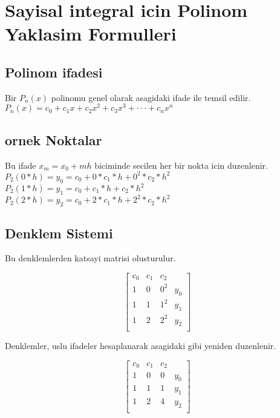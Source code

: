 \documentclass{article}
\begin{document}
\setlength\parindent{0pt}
\section{Sayisal integral icin Polinom Yaklasim Formulleri}
\subsection{Polinom ifadesi}
Bir $P_{n}(x)$ polinomu genel olarak asagidaki ifade ile temsil edilir.\\
$\displaystyle P_{n}(x)= c_{0}+c_{1}x+c_{2}x^{2}+c_{3}x^{3}+\cdot\cdot\cdot+c_{n}x^{n}$
\subsection{ornek Noktalar}
Bu ifade $x_{m}=x_{0}+mh$ biciminde secilen her bir nokta icin duzenlenir.\\
$\displaystyle P_{2}(0*h)=y_{0}=c_{0}+0*c_{1}*h+0^{2}*c_{2}*h^{2}$\\
$\displaystyle P_{2}(1*h)=y_{1}=c_{0}+c_{1}*h+c_{2}*h^{2}$\\
$\displaystyle P_{2}(2*h)=y_{2}=c_{0}+2*c_{1}*h+2^{2}*c_{2}*h^{2}$\\
\subsection{Denklem Sistemi}
Bu denklemlerden katsayi matrisi olusturulur.
\begin{center}
$$ \left[\begin{array}{rrr|r}
c_{0} & c_{1} & c_{2}\\
1 & 0 & 0^{2} & y_{0}\\
1 & 1 & 1^{2} & y_{1}\\
1 & 2 & 2^{2} & y_{2}\\
\end{array}\right] $$
\end{center}
Denklemler, uslu ifadeler hesaplanarak asagidaki gibi yeniden duzenlenir.
\begin{center}
$$ \left[\begin{array}{rrr|r}
c_{0} & c_{1} & c_{2}\\
1 & 0 & 0 & y_{0}\\
1 & 1 & 1 & y_{1}\\
1 & 2 & 4 & y_{2}\\
\end{array}\right] $$
\end{center}
\end{document}

